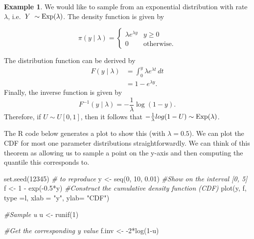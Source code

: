 \documentclass[
]{book}
\newenvironment{Shaded}{\begin{snugshade}}{\end{snugshade}}
\newcommand{\AttributeTok}[1]{\textcolor[rgb]{0.77,0.63,0.00}{#1}}
\newcommand{\CommentTok}[1]{\textcolor[rgb]{0.56,0.35,0.01}{\textit{#1}}}
\newcommand{\DecValTok}[1]{\textcolor[rgb]{0.00,0.00,0.81}{#1}}
\newcommand{\FloatTok}[1]{\textcolor[rgb]{0.00,0.00,0.81}{#1}}
\newcommand{\FunctionTok}[1]{\textcolor[rgb]{0.00,0.00,0.00}{#1}}
\newcommand{\NormalTok}[1]{#1}
\newcommand{\OtherTok}[1]{\textcolor[rgb]{0.56,0.35,0.01}{#1}}
\newcommand{\SpecialCharTok}[1]{\textcolor[rgb]{0.00,0.00,0.00}{#1}}
\newcommand{\StringTok}[1]{\textcolor[rgb]{0.31,0.60,0.02}{#1}}
\theoremstyle{definition}
\theoremstyle{definition}
\newtheorem{example}{Example}[chapter]
\theoremstyle{definition}
\theoremstyle{definition}
\theoremstyle{remark}
\begin{document}
\begin{example}
We would like to sample from an exponential distribution with rate \(\lambda\), i.e.~\(Y ~ \sim \hbox{Exp}(\lambda)\). The density function is given by

\[
\pi(y \mid \lambda) = \begin{cases} 
      \lambda e^{\lambda y} & y \geq 0 \\
    0  & \text{otherwise.}
   \end{cases}
\]

The distribution function can be derived by
\begin{align*}
F(y \mid \lambda) &= \int_0^y \lambda e^{\lambda t}\,dt \\
& =  1 - e^{\lambda y}.
\end{align*}
Finally, the inverse function is given by
\[
F^{-1}(y \mid \lambda) = -\frac{1}{\lambda}\log(1-y).  
\]
Therefore, if \(U \sim U[0, 1]\), then it follows that \(-\frac{1}{\lambda}log(1-U) \sim \hbox{Exp}(\lambda)\).

The R code below generates a plot to show this (with \(\lambda = 0.5\)). We can plot the CDF for most one parameter distributions straightforwardly. We can think of this theorem as allowing us to sample a point on the y-axis and then computing the quantile this corresponds to.

\begin{Shaded}
\begin{Highlighting}[]
\FunctionTok{set.seed}\NormalTok{(}\DecValTok{12345}\NormalTok{) }\CommentTok{\# to reproduce}
\NormalTok{y }\OtherTok{\textless{}{-}} \FunctionTok{seq}\NormalTok{(}\DecValTok{0}\NormalTok{, }\DecValTok{10}\NormalTok{, }\FloatTok{0.01}\NormalTok{) }\CommentTok{\#Show on the interval [0, 5]}
\NormalTok{f }\OtherTok{\textless{}{-}} \DecValTok{1} \SpecialCharTok{{-}} \FunctionTok{exp}\NormalTok{(}\SpecialCharTok{{-}}\FloatTok{0.5}\SpecialCharTok{*}\NormalTok{y)    }\CommentTok{\#Construct the cumulative density function (CDF)}
\FunctionTok{plot}\NormalTok{(y, f, }\AttributeTok{type =}\StringTok{\textquotesingle{}l\textquotesingle{}}\NormalTok{, }\AttributeTok{xlab =} \StringTok{"y"}\NormalTok{, }\AttributeTok{ylab=} \StringTok{"CDF"}\NormalTok{)}

\CommentTok{\#Sample u}
\NormalTok{u }\OtherTok{\textless{}{-}} \FunctionTok{runif}\NormalTok{(}\DecValTok{1}\NormalTok{)}

\CommentTok{\#Get the corresponding y value}
\NormalTok{f.inv }\OtherTok{\textless{}{-}} \SpecialCharTok{{-}}\DecValTok{2}\SpecialCharTok{*}\FunctionTok{log}\NormalTok{(}\DecValTok{1}\SpecialCharTok{{-}}\NormalTok{u)}


\end{Highlighting}
\end{Shaded}
\end{example}
\end{document}
